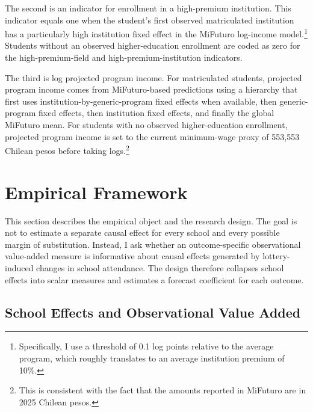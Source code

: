 \documentclass[a4paper, article, english, oneside, unknownkeysallowed, 12pt]{memoir}
\begin{document}
The second is an indicator for enrollment in a high-premium institution.
This indicator equals one when the student's first observed matriculated institution has a particularly high institution fixed effect in the MiFuturo log-income model.\footnote{Specifically, I use a threshold of 0.1 log points relative to the average program, which roughly translates to an average institution premium of 10\%.}
Students without an observed higher-education enrollment are coded as zero for the high-premium-field and high-premium-institution indicators.

The third is log projected program income.
For matriculated students, projected program income comes from MiFuturo-based predictions using a hierarchy that first uses institution-by-generic-program fixed effects when available, then generic-program fixed effects, then institution fixed effects, and finally the global MiFuturo mean.
For students with no observed higher-education enrollment, projected program income is set to the current minimum-wage proxy of 553,553 Chilean pesos before taking logs.\footnote{This is consistent with the fact that the amounts reported in MiFuturo are in 2025 Chilean pesos.}



\clearpage 
\section{Empirical Framework}

This section describes the empirical object and the research design.
The goal is not to estimate a separate causal effect for every school and every possible margin of substitution.
Instead, I ask whether an outcome-specific observational value-added measure is informative about causal effects generated by lottery-induced changes in school attendance.
The design therefore collapses school effects into scalar measures and estimates a forecast coefficient for each outcome.

\subsection{School Effects and Observational Value Added}
\end{document}

